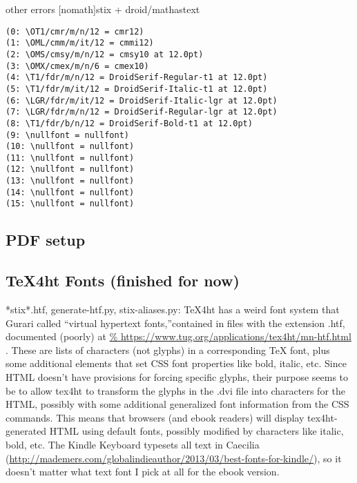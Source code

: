 \documentclass[12pt]{article}
\begin{document}
other errors
[nomath]stix + droid/mathastext
\begin{lstlisting}
(0: \OT1/cmr/m/n/12 = cmr12)
(1: \OML/cmm/m/it/12 = cmmi12)
(2: \OMS/cmsy/m/n/12 = cmsy10 at 12.0pt)
(3: \OMX/cmex/m/n/6 = cmex10)
(4: \T1/fdr/m/n/12 = DroidSerif-Regular-t1 at 12.0pt)
(5: \T1/fdr/m/it/12 = DroidSerif-Italic-t1 at 12.0pt)
(6: \LGR/fdr/m/it/12 = DroidSerif-Italic-lgr at 12.0pt)
(7: \LGR/fdr/m/n/12 = DroidSerif-Regular-lgr at 12.0pt)
(8: \T1/fdr/b/n/12 = DroidSerif-Bold-t1 at 12.0pt)
(9: \nullfont = nullfont)
(10: \nullfont = nullfont)
(11: \nullfont = nullfont)
(12: \nullfont = nullfont)
(13: \nullfont = nullfont)
(14: \nullfont = nullfont)
(15: \nullfont = nullfont)  
\end{lstlisting}


\subsection{PDF setup}
\label{sec:latex_pdf}





\subsection{TeX4ht Fonts (finished for now)}
\label{sec:tex4ht_fonts}

*stix*.htf, generate-htf.py, stix-aliases.py: TeX4ht has a weird font
system that Gurari called ``virtual hypertext fonts,''contained in
files with the extension .htf, documented (poorly) at
\url{%
https://www.tug.org/applications/tex4ht/mn-htf.html
} .  These are
lists of characters (not glyphs) in a corresponding TeX font, plus
some additional elements that set CSS font properties like bold,
italic, etc.  Since HTML doesn't have provisions for forcing specific
glyphs, their purpose seems to be to allow tex4ht to transform the
glyphs in the .dvi file into characters for the HTML, possibly with
some additional generalized font information from the CSS commands.
This means that browsers (and ebook readers) will display
tex4ht-generated HTML using default fonts, possibly modified by
characters like italic, bold, etc.  The Kindle Keyboard typesets all
text in Caecilia
(\url{http://mademers.com/globalindieauthor/2013/03/best-fonts-for-kindle/}),
so it doesn't matter what text font I pick at all for the ebook
version.
\end{document}

